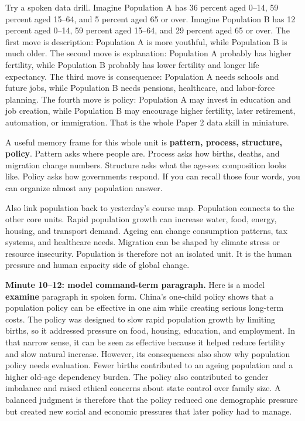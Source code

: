 \documentclass[11pt,a4paper]{article}
\newcommand{\term}[1]{\textcolor{HeadingBlue}{\textbf{#1}}}
\newcommand{\exam}[1]{\textcolor{AccentTeal}{\textbf{#1}}}
\begin{document}
Try a spoken data drill. Imagine Population A has 36 percent aged 0--14, 59
percent aged 15--64, and 5 percent aged 65 or over. Imagine Population B has 12
percent aged 0--14, 59 percent aged 15--64, and 29 percent aged 65 or over.
The first move is description: Population A is more youthful, while Population B
is much older. The second move is explanation: Population A probably has higher
fertility, while Population B probably has lower fertility and longer life
expectancy. The third move is consequence: Population A needs schools and future
jobs, while Population B needs pensions, healthcare, and labor-force planning.
The fourth move is policy: Population A may invest in education and job creation,
while Population B may encourage higher fertility, later retirement, automation,
or immigration. That is the whole Paper 2 data skill in miniature.

A useful memory frame for this whole unit is \term{pattern, process, structure,
policy}. Pattern asks where people are. Process asks how births, deaths, and
migration change numbers. Structure asks what the age-sex composition looks like.
Policy asks how governments respond. If you can recall those four words, you can
organize almost any population answer.

Also link population back to yesterday's course map. Population connects to the
other core units. Rapid population growth can increase water, food, energy,
housing, and transport demand. Ageing can change consumption patterns, tax
systems, and healthcare needs. Migration can be shaped by climate stress or
resource insecurity. Population is therefore not an isolated unit. It is the
human pressure and human capacity side of global change.

\textbf{Minute 10--12: model command-term paragraph.}
Here is a model \exam{examine} paragraph in spoken form. China's one-child
policy shows that a population policy can be effective in one aim while creating
serious long-term costs. The policy was designed to slow rapid population
growth by limiting births, so it addressed pressure on food, housing, education,
and employment. In that narrow sense, it can be seen as effective because it
helped reduce fertility and slow natural increase. However, its consequences
also show why population policy needs evaluation. Fewer births contributed to
an ageing population and a higher old-age dependency burden. The policy also
contributed to gender imbalance and raised ethical concerns about state control
over family size. A balanced judgment is therefore that the policy reduced one
demographic pressure but created new social and economic pressures that later
policy had to manage.
\end{document}

